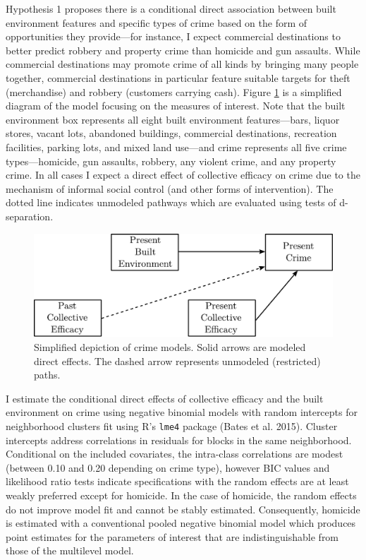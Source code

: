 \documentclass [11pt, proquest] {uwthesis}[2015/03/03]
\begin{document}
Hypothesis 1 proposes there is a conditional direct association between built environment features and specific types of crime based on the form of opportunities they provide---for instance, I expect commercial destinations to better predict robbery and property crime than homicide and gun assaults. While commercial destinations may promote crime of all kinds by bringing many people together, commercial destinations in particular feature suitable targets for theft (merchandise) and robbery (customers carrying cash). Figure \ref{fig:directmodels} is a simplified diagram of the model focusing on the measures of interest. Note that the built environment box represents all eight built environment features---bars, liquor stores, vacant lots, abandoned buildings, commercial destinations, recreation facilities, parking lots, and mixed land use---and crime represents all five crime types---homicide, gun assaults, robbery, any violent crime, and any property crime. In all cases I expect a direct effect of collective efficacy on crime due to the mechanism of informal social control (and other forms of intervention). The dotted line indicates unmodeled pathways which are evaluated using tests of d-separation.\linebreak
\linebreak
\begin{figure}
\includegraphics[width=1\linewidth]{./figure/ch2/direct_models} \caption[Simplified depiction of crime models.]{Simplified depiction of crime models. Solid arrows are modeled direct effects. The dashed arrow represents unmodeled (restricted) paths.}\label{fig:directmodels}
\end{figure}
I estimate the conditional direct effects of collective efficacy and the built environment on crime using negative binomial models with random intercepts for neighborhood clusters fit using R's \texttt{lme4} package (Bates et al. 2015). Cluster intercepts address correlations in residuals for blocks in the same neighborhood. Conditional on the included covariates, the intra-class correlations are modest (between 0.10 and 0.20 depending on crime type), however BIC values and likelihood ratio tests indicate specifications with the random effects are at least weakly preferred except for homicide. In the case of homicide, the random effects do not improve model fit and cannot be stably estimated. Consequently, homicide is estimated with a conventional pooled negative binomial model which produces point estimates for the parameters of interest that are indistinguishable from those of the multilevel model.
\end{document}
